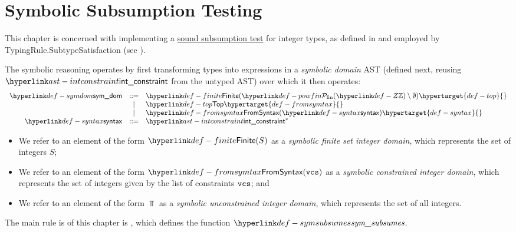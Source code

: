 \chapter{Symbolic Subsumption Testing\label{chap:SymbolicSubsumptionTesting}}
This chapter is concerned with implementing a \hyperlink{def-soundsubsumptiontest}{sound subsumption test}
for integer types, as defined in  and employed by
TypingRule.SubtypeSatisfaction (see ).

\hypertarget{def-symbolicdomain}{}
The symbolic reasoning operates by first transforming types into expressions in a \emph{symbolic domain} AST
(defined next, reusing $\intconstraint$ from the untyped AST) over which it then operates:
\hypertarget{def-symdom}{}
\hypertarget{def-finite}{}
\[
  \begin{array}{rcl}
    \symdom &::=& \Finite(\powfin{\Z} \setminus \emptyset) \hypertarget{def-top}{}\\
            &|  & \Top                      \hypertarget{def-fromsymtax}{}\\
            &|  & \FromSyntax(\syntax)      \hypertarget{def-syntax}{}\\
    \syntax &::=& \intconstraint^*
  \end{array}
\]

\begin{itemize}
  \item We refer to an element of the form $\Finite(S)$ as a \emph{symbolic finite set integer domain},
        which represents the set of integers $S$;
  \item We refer to an element of the form $\FromSyntax(\vcs)$ as a \emph{symbolic constrained integer domain},
        which represents the set of integers given by the list of constraints $\texttt{vcs}$; and
  \item We refer to an element of the form $\Top$ as a \emph{symbolic unconstrained integer domain},
        which represents the set of all integers.
\end{itemize}

The main rule is of this chapter is , which defines the function
$\symsubsumes$.

